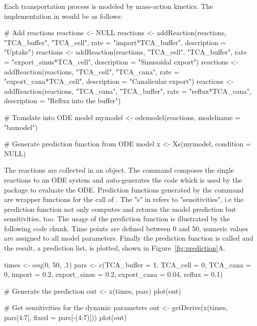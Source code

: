 \documentclass[article]{jss}
\begin{document}
Each transportation process is modeled by mass-action kinetics. The implementation in  would be as follows:
\begin{CodeChunk}
	\begin{CodeInput}
# Add reactions
reactions <- NULL
reactions <- addReaction(reactions, "TCA_buffer", "TCA_cell",
			 rate = "import*TCA_buffer",
			 description = "Uptake")
reactions <- addReaction(reactions, "TCA_cell", "TCA_buffer",
			 rate = "export_sinus*TCA_cell",
			 description = "Sinusoidal export")
reactions <- addReaction(reactions, "TCA_cell", "TCA_cana",
			 rate = "export_cana*TCA_cell",
			 description = "Canalicular export")
reactions <- addReaction(reactions, "TCA_cana", "TCA_buffer",
			 rate = "reflux*TCA_cana",
			 description = "Reflux into the buffer")

# Translate into ODE model
mymodel <- odemodel(reactions, modelname = "bamodel")

# Generate prediction function from ODE model
x <- Xs(mymodel, condition = NULL)
	\end{CodeInput}
\end{CodeChunk}
The reactions are collected in an  object. The  command composes the single reactions to an ODE system and auto-generates the  code which is used by the  package to evaluate the ODE. Prediction functions generated by the  command are wrapper functions for the call of . The "s" in  refers to "sensitivities", i.e the prediction function not only computes and returns the model prediction but sensitivities, too. The usage of the prediction function is illustrated by the following code chunk. Time points are defined between 0 and 50, numeric values are assigned to all model parameters. Finally the prediction function is called and the result, a prediction list, is plotted, shown in Figure~\ref{fig:prediction}A.

\begin{CodeChunk}
\begin{CodeInput}
times <- seq(0, 50, .1)
pars <- c(TCA_buffer = 1,
          TCA_cell = 0,
	  TCA_cana = 0,
	  import = 0.2,
	  export_sinus = 0.2,
	  export_cana = 0.04,
	  reflux = 0.1)

# Generate the prediction
out <- x(times, pars)
plot(out)

# Get sensitivities for the dynamic parameters
out <- getDerivs(x(times, pars[4:7], fixed = pars[-(4:7)]))
plot(out)
\end{CodeInput}
\end{CodeChunk}
\end{document}
